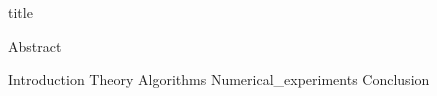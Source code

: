 \documentclass{article}
\begin{document}


{title}

\frontmatter

{Abstract}
\newpage

\tableofcontents


\mainmatter


{Introduction}
{Theory}
{Algorithms}
{Numerical_experiments}
{Conclusion}



\newpage
\printbibliography[heading = bibintoc, title = Bibliography]    %


\end{document}
